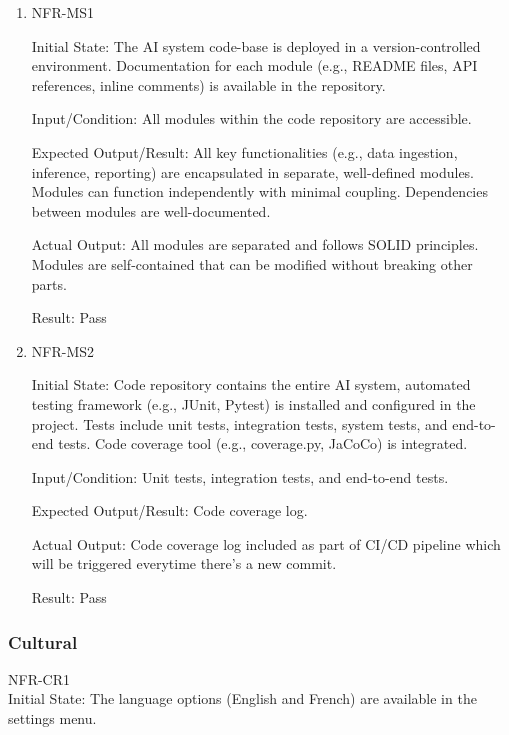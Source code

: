 \documentclass[12pt, titlepage]{article}
\begin{document}
\begin{enumerate}

  \item{NFR-MS1\\}\label{NFR-MS1}
  
  Initial State: The AI system code-base is deployed in a version-controlled environment. Documentation for each module (e.g., README files, API references, inline comments) is available in the repository.
  
  Input/Condition: All modules within the code repository are accessible.
  
  Expected Output/Result: All key functionalities (e.g., data ingestion, inference, reporting) are encapsulated in separate, well-defined modules. Modules can function independently with minimal coupling. Dependencies between modules are well-documented.
  
  Actual Output: All modules are separated and follows SOLID principles. Modules are self-contained that can be modified without breaking other parts.
  
  Result: Pass

  \item{NFR-MS2\\}\label{NFR-MS2}

  Initial State: Code repository contains the entire AI system, automated testing framework (e.g., JUnit, Pytest) is installed and configured in the project. Tests include unit tests, integration tests, system tests, and end-to-end tests. Code coverage tool (e.g., coverage.py, JaCoCo) is integrated.

  Input/Condition: Unit tests, integration tests, and end-to-end tests.

  Expected Output/Result: Code coverage log.

  Actual Output: Code coverage log included as part of CI/CD pipeline which will be triggered everytime there's a new commit.

  Result: Pass

\end{enumerate}

\subsubsection{Cultural}
\item{NFR-CR1\\}\label{NFR-CR1}
Initial State: The language options (English and French) are available in the settings menu.
\end{document}
